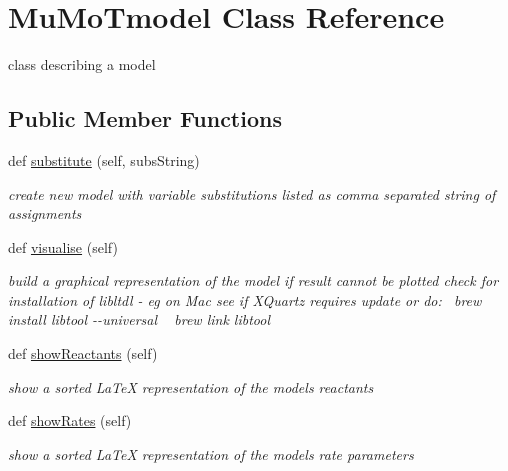 \hypertarget{class_mu_mo_t_1_1_mu_mo_tmodel}{}\section{Mu\+Mo\+Tmodel Class Reference}
\label{class_mu_mo_t_1_1_mu_mo_tmodel}


class describing a model  


\subsection*{Public Member Functions}
\begin{DoxyCompactItemize}
\item 
def \hyperlink{class_mu_mo_t_1_1_mu_mo_tmodel_a2eec4a3b8deda7c717c06ed89c24d570}{substitute} (self, subs\+String)
\begin{DoxyCompactList}\small\item\em create new model with variable substitutions listed as comma separated string of assignments \end{DoxyCompactList}\item 
def \hyperlink{class_mu_mo_t_1_1_mu_mo_tmodel_affc6fae7ea26f85cde5366af8af85200}{visualise} (self)
\begin{DoxyCompactList}\small\item\em build a graphical representation of the model if result cannot be plotted check for installation of libltdl -\/ eg on Mac see if X\+Quartz requires update or do\+:~\newline
 {\ttfamily brew install libtool -\/-\/universal} ~\newline
 {\ttfamily brew link libtool} \end{DoxyCompactList}\item 
def \hyperlink{class_mu_mo_t_1_1_mu_mo_tmodel_a2feaf6de25201c1e6503cd2ed131a1f2}{show\+Reactants} (self)
\begin{DoxyCompactList}\small\item\em show a sorted La\+TeX representation of the model\textquotesingle{}s reactants \end{DoxyCompactList}\item 
def \hyperlink{class_mu_mo_t_1_1_mu_mo_tmodel_a9c88600ec8eda7be7b7faeacd99f1682}{show\+Rates} (self)
\begin{DoxyCompactList}\small\item\em show a sorted La\+TeX representation of the model\textquotesingle{}s rate parameters \end{DoxyCompactList}\item 

\end{DoxyCompactItemize}
